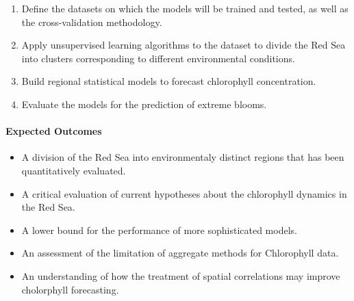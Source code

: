 \begin{enumerate}

\item Define the datasets on which the models will be trained and tested,
as well as the cross-validation methodology.

\item Apply unsupervised learning algorithms to the dataset to divide
the Red Sea into clusters corresponding to different environmental
conditions.

\item Build regional statistical models to forecast chlorophyll concentration.

\item Evaluate the models for the prediction of extreme blooms.

\end{enumerate}

\paragraph{Expected Outcomes}

\begin{itemize}

\item A division of the Red Sea into environmentaly distinct regions that has
been quantitatively evaluated.

\item A critical evaluation of current hypotheses about the chlorophyll
dynamics in the Red Sea.

\item A lower bound for the performance of more sophisticated models.

\item An assessment of the limitation of aggregate methods for Chlorophyll
data.

\item An understanding of how the treatment of spatial correlations may improve
cholorphyll forecasting.

\end{itemize}

